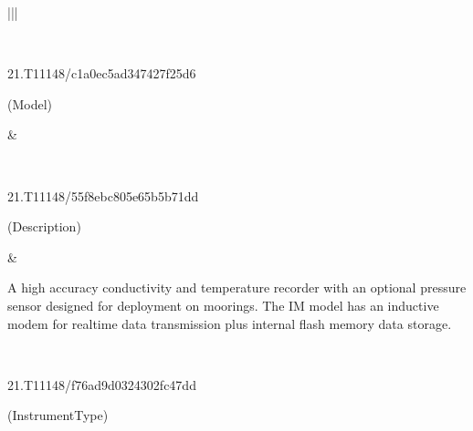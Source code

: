 \documentclass[a4paper,10pt,english]{sphinxmanual}
\begin{document}
\begin{savenotes}
\begin{tabular}[t]{|*{2}{|}}
\begin{sphinxVerbatimintable}[commandchars=\\\{\}]
\PYG{p}{]}
\end{sphinxVerbatimintable}
\\
\hline
\begin{DUlineblock}{0em}
\item[] 21.T11148/c1a0ec5ad347427f25d6
\item[] (Model)
\end{DUlineblock}
&
\begin{sphinxVerbatimintable}[commandchars=\\\{\}]
\PYG{p}{[}
\PYG{p}{]}
\end{sphinxVerbatimintable}
\\
\hline
\begin{DUlineblock}{0em}
\item[] 21.T11148/55f8ebc805e65b5b71dd
\item[] (Description)
\end{DUlineblock}
&
\begin{sphinxVerbatimintable}[commandchars=\\\{\}]
A high accuracy conductivity and temperature recorder with an optional
pressure sensor designed for deployment on moorings. The IM model has an
inductive modem for real\PYGZhy{}time data transmission plus internal flash memory
data storage.
\end{sphinxVerbatimintable}
\\
\hline
\begin{DUlineblock}{0em}
\item[] 21.T11148/f76ad9d0324302fc47dd
\item[] (InstrumentType)

\end{DUlineblock}
\end{tabular}
\end{savenotes}
\end{document}
